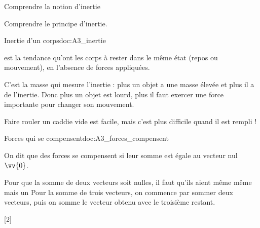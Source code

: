 \teteSndMouv

\vspace*{-36pt}

\vspace*{-16pt}
\begin{objectifs}
  \item Comprendre la notion d'inertie
  \item Comprendre le principe d'inertie.
\end{objectifs}


\begin{doc}{Inertie d'un corps}{doc:A3_inertie}
  \begin{importants}
     est la tendance qu'ont les corps à rester dans le même état (repos ou mouvement), en l'absence de forces appliquées.
  \end{importants}
    
  C'est la masse qui mesure l'inertie : plus un objet a une masse élevée et plus il a de l'inertie.
  Donc plus un objet est lourd, plus il faut exercer une force importante pour changer son mouvement.
  
  \exemple Faire rouler un caddie vide est facile, mais c'est plus difficile quand il est rempli !
\end{doc}


\begin{doc}{Forces qui se compensent}{doc:A3_forces_compensent}
  \begin{importants} 
    On dit que des forces se compensent si leur somme est égale au vecteur nul $\vv{0}$.
  \end{importants}
  Pour que la somme de deux vecteurs soit nulles, il faut qu'ils aient même  même  mais un 
  Pour la somme de trois vecteurs, on commence par sommer deux vecteurs, puis on somme le vecteur obtenu avec le troisième restant.
  
  \centering
\end{doc}

\newpage
{}[2]


